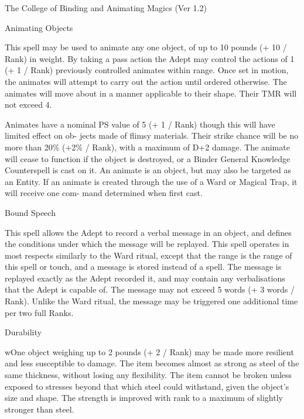 \begin{Chapter}{The College of Binding and Animating Magics (Ver 1.2)}
\begin{spell}[G-2]{Animating Objects}
\begin{effects}
This spell may be used to animate any one object, of up to 10 pounds
(+ 10 / Rank) in weight.  By taking a pass action the Adept may
control the actions of 1 (+ 1 / Rank) previously controlled animates
within range.  Once set in motion, the animates will attempt to carry
out the action until ordered otherwise.  The animates will move about
in a manner applicable to their shape.  Their TMR will not exceed 4.

Animates have a nominal PS value of 5 (+ 1 / Rank) though this will
have limited effect on ob- jects made of flimsy materials. Their
strike chance will be no more than 20\% (+2\% / Rank), with a maximum
of D+2 damage. The animate will cease to function if the object is
destroyed, or a Binder General Knowledge Counterspell is cast on it.
An animate is an object, but may also be targeted as an Entity. If an
animate is created through the use of a Ward or Magical Trap, it will
receive one com- mand determined when first cast.
\end{effects}
\end{spell}

\begin{spell}[G-3]{Bound Speech}

\begin{effects}
This spell allows the Adept to record a verbal message in an object,
and defines the conditions under which the message will be replayed.
This spell operates in most respects similarly to the Ward ritual,
except that the range is the range of this spell or touch, and a
message is stored instead of a spell.  The message is replayed exactly
as the Adept recorded it, and may contain any verbalisations that the
Adept is capable of.  The message may not exceed 5 words (+ 3 words /
Rank).  Unlike the Ward ritual, the message may be triggered one
additional time per two full Ranks.
\end{effects}
\end{spell}

\begin{spell}[G-4]{Durability}

\begin{effects}
wOne object weighing up to 2 pounds (+ 2 / Rank) may be made more
resilient and less susceptible to damage.  The item becomes almost as
strong as steel of the same thickness, without losing any flexibility.
The item cannot be broken unless exposed to stresses beyond that which
steel could withstand, given the object’s size and shape.  The
strength is improved with rank to a maximum of slightly stronger than
steel.


\end{effects}
\end{spell}
\end{Chapter}
